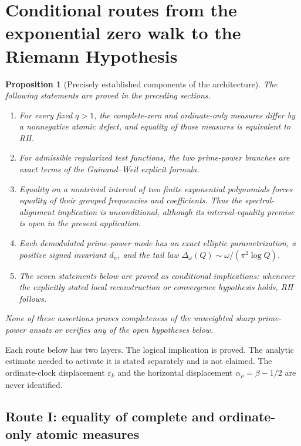 \documentclass[11pt]{amsart}
\numberwithin{equation}{section}
\theoremstyle{plain}
\newtheorem{proposition}[theorem]{Proposition}
\theoremstyle{definition}
\theoremstyle{remark}
\newcommand{\1}{\mathbf{1}}
\begin{document}
\section{Conditional routes from the exponential zero walk to the Riemann Hypothesis}
\label{sec:routes_to_RH}

\begin{proposition}[Precisely established components of the architecture]
\label{prop:established_architecture_components}
The following statements are proved in the preceding sections.
\begin{enumerate}[label=\textup{(\roman*)}]
\item For every fixed \(q>1\), the complete-zero and ordinate-only measures
differ by a nonnegative atomic defect, and equality of those measures is
equivalent to RH.
\item For admissible regularized test functions, the two prime-power branches
are exact terms of the Guinand--Weil explicit formula.
\item Equality on a nontrivial interval of two finite exponential
polynomials forces equality of their grouped frequencies and coefficients.
Thus the spectral-alignment implication is unconditional, although its
interval-equality premise is open in the present application.
\item Each demodulated prime-power mode has an exact elliptic parametrization,
a positive signed invariant \(d_n\), and the tail law
\(\Delta_\omega(Q)\sim\omega/(\pi^2\log Q)\).
\item The seven statements below are proved as conditional implications:
whenever the explicitly stated local reconstruction or convergence hypothesis
holds, RH follows.
\end{enumerate}
None of these assertions proves completeness of the unweighted sharp
prime-power ansatz or verifies any of the open hypotheses below.
\end{proposition}

Each route below has two layers.  The logical implication is proved.  The
analytic estimate needed to activate it is stated separately and is not
claimed.  The ordinate-clock displacement $\varepsilon_k$ and the horizontal
displacement $\alpha_\rho=\beta-1/2$ are never identified.

\subsection{Route I: equality of complete and ordinate-only atomic measures}
\label{subsec:route_atomic_equality}
\end{document}
